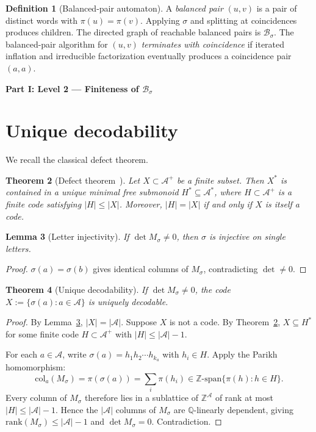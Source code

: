 \documentclass[11pt]{article}
\theoremstyle{plain}
\newtheorem{theorem}{Theorem}[section]
\newtheorem{lemma}[theorem]{Lemma}
\theoremstyle{definition}
\newtheorem{definition}[theorem]{Definition}
\theoremstyle{remark}
\newcommand{\Z}{\mathbb{Z}}
\newcommand{\Q}{\mathbb{Q}}
\newcommand{\A}{\mathcal{A}}
\newcommand{\B}{\mathcal{B}}
\begin{document}
\begin{definition}[Balanced-pair automaton]\label{def:BPA}
A \emph{balanced pair} $(u,v)$ is a pair of distinct words with $\pi(u)=\pi(v)$. Applying $\sigma$ and splitting at coincidences produces children. The directed graph of reachable balanced pairs is $\B_\sigma$. The balanced-pair algorithm for $(u,v)$ \emph{terminates with coincidence} if iterated inflation and irreducible factorization eventually produces a coincidence pair $(a,a)$.
\end{definition}

\begin{center}\textbf{Part I: Level 2 --- Finiteness of $\B_\sigma$}\end{center}

\section{Unique decodability}\label{sec:UD}

We recall the classical defect theorem.

\begin{theorem}[Defect theorem~\cite{BPPR,BPR}]\label{thm:defect}
Let $X\subset\A^+$ be a finite subset. Then $X^*$ is contained in a unique minimal free submonoid $H^*\subseteq\A^*$, where $H\subset\A^+$ is a finite code satisfying $|H|\le|X|$. Moreover, $|H|=|X|$ if and only if $X$ is itself a code.
\end{theorem}

\begin{lemma}[Letter injectivity]\label{lem:letter-inj}
If $\det M_\sigma\ne 0$, then $\sigma$ is injective on single letters.
\end{lemma}

\begin{proof}
$\sigma(a)=\sigma(b)$ gives identical columns of $M_\sigma$, contradicting $\det\ne 0$.
\end{proof}

\begin{theorem}[Unique decodability]\label{thm:UD}
If $\det M_\sigma\ne 0$, the code $X:=\{\sigma(a):a\in\A\}$ is uniquely decodable.
\end{theorem}

\begin{proof}
By Lemma~\ref{lem:letter-inj}, $|X|=|\A|$. Suppose $X$ is not a code. By Theorem~\ref{thm:defect}, $X\subseteq H^*$ for some finite code $H\subset\A^+$ with $|H|\le|\A|-1$.

For each $a\in\A$, write $\sigma(a)=h_1h_2\cdots h_{k_a}$ with $h_i\in H$. Apply the Parikh homomorphism:
\[
\mathrm{col}_a(M_\sigma)=\pi(\sigma(a))=\sum_i\pi(h_i)\in\Z\text{-span}\{\pi(h):h\in H\}.
\]
Every column of $M_\sigma$ therefore lies in a sublattice of $\Z^\A$ of rank at most $|H|\le|\A|-1$. Hence the $|\A|$ columns of $M_\sigma$ are $\Q$-linearly dependent, giving $\mathrm{rank}(M_\sigma)\le|\A|-1$ and $\det M_\sigma=0$. Contradiction.
\end{proof}
\end{document}
